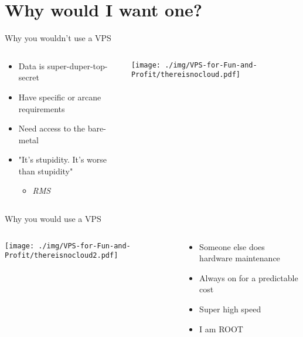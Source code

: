 \documentclass[presentation,aspectratio=169]{beamer}
\begin{document}
\section{Why would I want one?}
\label{sec-3}
\begin{frame}[label=sec-3-0-1]{Why you wouldn't use a VPS}
\begin{columns}
\begin{column}{0.45\textwidth}

\begin{itemize}
\item Data is super-duper-top-secret
\item Have specific or arcane requirements
\item Need access to the bare-metal
\item "It's stupidity. It's worse than stupidity"
\begin{itemize}
\item \emph{RMS}
\end{itemize}
\end{itemize}
\end{column}

\begin{column}{0.45\textwidth}

\texttt{[image: ./img/VPS-for-Fun-and-Profit/thereisnocloud.pdf]}
\end{column}
\end{columns}
\end{frame}

\begin{frame}[label=sec-3-0-2]{Why you would use a VPS}
\begin{columns}
\begin{column}{0.45\textwidth}

\texttt{[image: ./img/VPS-for-Fun-and-Profit/thereisnocloud2.pdf]}
\end{column}

\begin{column}{0.45\textwidth}

\begin{itemize}
\item Someone else does hardware maintenance
\item Always on for a predictable cost
\item Super high speed
\item I am ROOT
\end{itemize}
\end{column}
\end{columns}
\end{frame}
\end{document}
